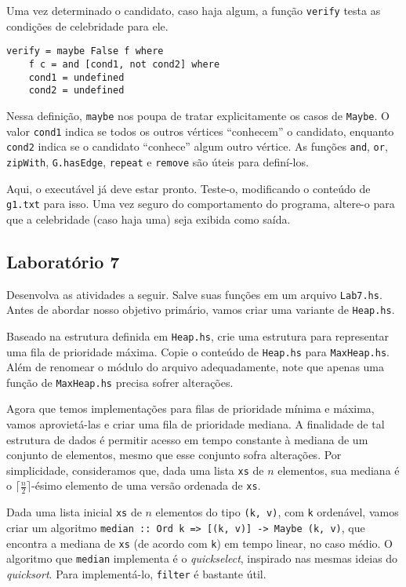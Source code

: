 \documentclass[a4paper]{article}
\begin{document}
Uma vez determinado o candidato, caso haja algum, a função \texttt{verify} testa as condições de celebridade para ele.

\begin{verbatim}
verify = maybe False f where
	f c = and [cond1, not cond2] where
	cond1 = undefined
	cond2 = undefined
\end{verbatim}

Nessa definição, \texttt{maybe} nos poupa de tratar explicitamente os casos de \texttt{Maybe}.
O valor \texttt{cond1} indica se todos os outros vértices ``conhecem'' o candidato, enquanto \texttt{cond2} indica se o candidato ``conhece'' algum outro vértice.
As funções \texttt{and}, \texttt{or}, \texttt{zipWith}, \texttt{G.hasEdge}, \texttt{repeat} e \texttt{remove} são úteis para definí-los.

Aqui, o executável já deve estar pronto.
Teste-o, modificando o conteúdo de \texttt{g1.txt} para isso.
Uma vez seguro do comportamento do programa, altere-o para que a celebridade (caso haja uma) seja exibida como saída.

\subsection{Laboratório 7}

Desenvolva as atividades a seguir.
Salve suas funções em um arquivo \texttt{Lab7.hs}.
Antes de abordar nosso objetivo primário, vamos criar uma variante de \texttt{Heap.hs}.

Baseado na estrutura definida em \texttt{Heap.hs}, crie uma estrutura para representar uma fila de prioridade máxima.
Copie o conteúdo de \texttt{Heap.hs} para \texttt{MaxHeap.hs}.
Além de renomear o módulo do arquivo adequadamente, note que apenas uma função de \texttt{MaxHeap.hs} precisa sofrer alterações.

Agora que temos implementações para filas de prioridade mínima e máxima, vamos aprovietá-las e criar uma fila de prioridade mediana.
A finalidade de tal estrutura de dados é permitir acesso em tempo constante à mediana de um conjunto de elementos, mesmo que esse conjunto sofra alterações.
Por simplicidade, consideramos que, dada uma lista \texttt{xs} de $n$ elementos, sua mediana é o $\lceil\frac{n}{2}\rceil$-ésimo elemento de uma versão ordenada de \texttt{xs}.

Dada uma lista inicial \texttt{xs} de $n$ elementos do tipo \texttt{(k, v)}, com \texttt{k} ordenável, vamos criar um algoritmo \mbox{\texttt{median :: Ord k => [(k, v)] -> Maybe (k, v)}}, que encontra a mediana de \texttt{xs} (de acordo com \texttt{k}) em tempo linear, no caso médio.
O algoritmo que \texttt{median} implementa é o \emph{quickselect}, inspirado nas mesmas ideias do \emph{quicksort}.
Para implementá-lo, \texttt{filter} é bastante útil.
\end{document}
